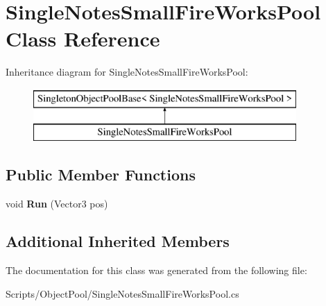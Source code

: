 \hypertarget{class_single_notes_small_fire_works_pool}{}\section{Single\+Notes\+Small\+Fire\+Works\+Pool Class Reference}
\label{class_single_notes_small_fire_works_pool}
Inheritance diagram for Single\+Notes\+Small\+Fire\+Works\+Pool\+:\begin{figure}[H]
\begin{center}
\leavevmode
\includegraphics[height=2.000000cm]{class_single_notes_small_fire_works_pool}
\end{center}
\end{figure}
\subsection*{Public Member Functions}
\begin{DoxyCompactItemize}
\item 
void {\bfseries Run} (Vector3 pos)\hypertarget{class_single_notes_small_fire_works_pool_abb102bd0e2551b7e2b4f94d3c8494aa8}{}\label{class_single_notes_small_fire_works_pool_abb102bd0e2551b7e2b4f94d3c8494aa8}

\end{DoxyCompactItemize}
\subsection*{Additional Inherited Members}


The documentation for this class was generated from the following file\+:\begin{DoxyCompactItemize}
\item 
Scripts/\+Object\+Pool/Single\+Notes\+Small\+Fire\+Works\+Pool.\+cs\end{DoxyCompactItemize}
